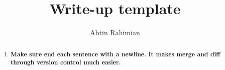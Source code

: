 \title{Write-up template}

\author[nyu]{Abtin Rahimian} 
%
\address[nyu]{Courant Institute of Mathematical Sciences, New York
  University, New York, NY 10003}
%
\begin{abstract}
  \begin{enumerate}
  \item \textbf{Make sure end each sentence with a newline. It makes merge
    and diff through version control much easier.}
  \end{enumerate}
\end{abstract}
\maketitle
